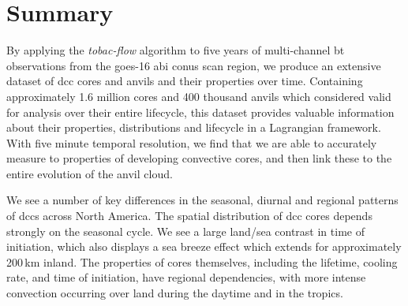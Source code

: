 


\section{Summary}  %

By applying the \textit{tobac-flow} algorithm to five years of multi-channel \acrshort{bt} observations from the \acrshort{goes}-16 \acrshort{abi} \acrshort{conus} scan region, we produce an extensive dataset of \acrshort{dcc} cores and anvils and their properties over time.
Containing approximately 1.6 million cores and 400 thousand anvils which considered valid for analysis over their entire lifecycle, this dataset provides valuable information about their properties, distributions and lifecycle in a Lagrangian framework.
With five minute temporal resolution, we find that we are able to accurately measure to properties of developing convective cores, and then link these to the entire evolution of the anvil cloud.

We see a number of key differences in the seasonal, diurnal and regional patterns of \acrshort{dcc}s across North America.
The spatial distribution of \acrshort{dcc} cores depends strongly on the seasonal cycle.
We see a large land/sea contrast in time of initiation, which also displays a sea breeze effect which extends for approximately 200\,\unit{km} inland.
The properties of cores themselves, including the lifetime, cooling rate, and time of initiation, have regional dependencies, with more intense convection occurring over land during the daytime and in the tropics.

